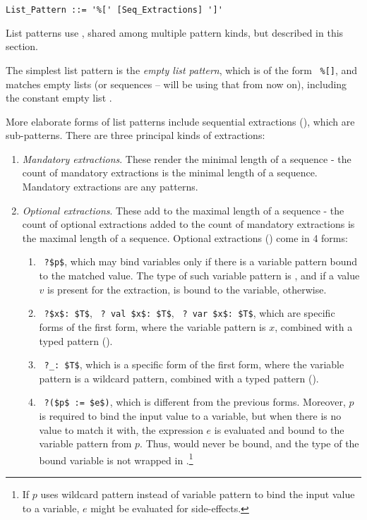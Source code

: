 \syntax\begin{lstlisting}
List_Pattern ::= '%[' [Seq_Extractions] ']'
\end{lstlisting}

List patterns use , shared among multiple pattern kinds, but described in this section. 

The simplest list pattern is the {\em empty list pattern}, which is of the form ~\lstinline!%[]!, and matches empty lists (or sequences -- will be using that from now on), including the constant empty list . 

More elaborate forms of list patterns include sequential extractions (), which are sub-patterns. There are three principal kinds of extractions:
\begin{enumerate}
  \item {\em Mandatory extractions}. These render the minimal length of a sequence - the count of mandatory extractions is the minimal length of a sequence. Mandatory extractions are any patterns. 
  \item {\em Optional extractions}. These add to the maximal length of a sequence - the count of optional extractions added to the count of mandatory extractions is the maximal length of a sequence. Optional extractions () come in 4 forms:
    \begin{enumerate}
      \item ~\lstinline!?$p$!, which may bind variables only if there is a variable pattern bound to the matched value. The type of such variable pattern is , and if a value $v$ is present for the extraction,  is bound to the variable,  otherwise. 
      \item ~\lstinline!?$x$: $T$!, ~\lstinline!? val $x$: $T$!, ~\lstinline!? var $x$: $T$!, which are specific forms of the first form, where the variable pattern is $x$, combined with a typed pattern (). 
      \item ~\lstinline!?_: $T$!, which is a specific form of the first form, where the variable pattern is a wildcard pattern, combined with a typed pattern (). 
      \item ~\lstinline!?($p$ := $e$)!, which is different from the previous forms. Moreover, $p$ is required to bind the input value to a variable, but when there is no value to match it with, the expression $e$ is evaluated and bound to the variable pattern from $p$. Thus,  would never be bound, and the type of the bound variable is not wrapped in .\footnote{If $p$ uses wildcard pattern instead of variable pattern to bind the input value to a variable, $e$ might be evaluated for side-effects.} 

\end{enumerate}
\end{enumerate}

